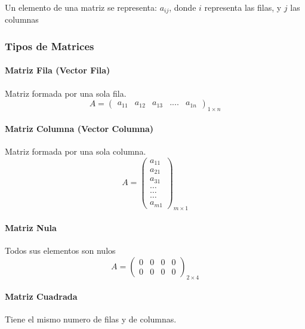 \documentclass[stu, 12pt, letterpaper, donotrepeattitle, floatsintext, natbib]{apa7}
\begin{document}
    Un elemento de una matriz se representa: {\Large $a_{ij}$}, donde {\Large $i$} representa las filas, y {\Large $j$} las columnas\\

    \subsubsection{Tipos de Matrices}

    \paragraph{Matriz Fila (Vector Fila)}
    Matriz formada por una sola fila.
    \[A=\begin{pmatrix}
            a_{11} & a_{12} & a_{13} & .... & a_{1n}
    \end{pmatrix}_{1\times n}\]

    \paragraph{Matriz Columna (Vector Columna)}
    Matriz formada por una sola columna.
    \[A=\begin{pmatrix}
            a_{11} \\ a_{21} \\ a_{31} \\ \dots \\ \dots \\ \dots \\ a_{m1}
    \end{pmatrix}_{m\times1}\]

    \paragraph{Matriz Nula}
    Todos sus elementos son nulos
    \[A=\begin{pmatrix}
            0 & 0 & 0 & 0 \\ 0 & 0 & 0 & 0
    \end{pmatrix}_{2\times4}\]

    \paragraph{Matriz Cuadrada}
    Tiene el mismo numero de filas y de columnas.
\end{document}
